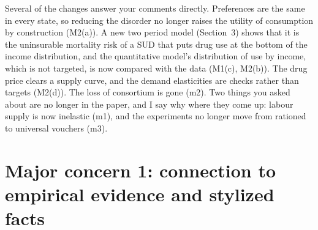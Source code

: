 \documentclass[11pt]{article}
\begin{document}
{Several of the changes answer your comments directly. Preferences are the same in
every state, so reducing the disorder no longer raises the utility of consumption by
construction (M2(a)). A new two period model (Section~3) shows that it is the
uninsurable mortality risk of a SUD that puts drug use at the bottom of the income
distribution, and the quantitative model's distribution of use by income, which is
not targeted, is now compared with the data (M1(c), M2(b)). The drug price clears a
supply curve, and the demand elasticities are checks rather than targets (M2(d)). The loss of
consortium is gone (m2). Two things you asked about are no longer in the paper, and
I say why where they come up: labour supply is now inelastic (m1), and the
experiments no longer move from rationed to universal vouchers (m3).
}

\section*{Major concern 1: connection to empirical evidence and stylized facts}
\end{document}
